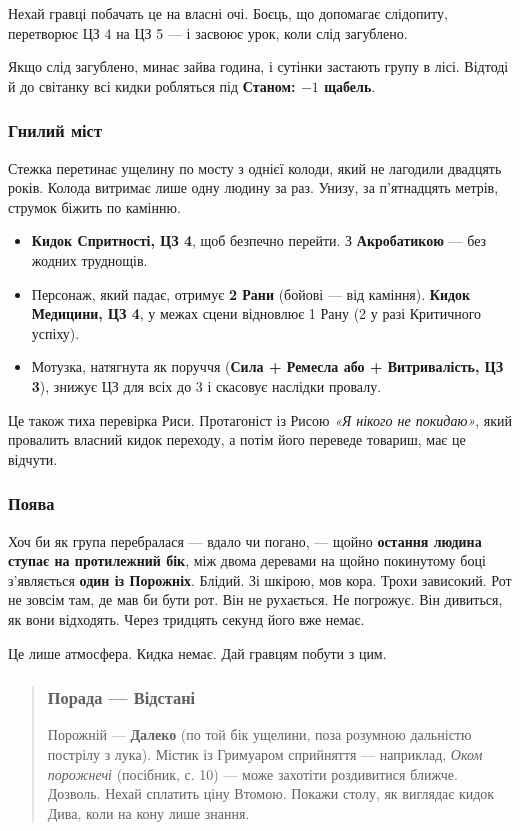 \documentclass[10pt,a4paper]{article}
\newcommand{\tightlist}{\setlength{\itemsep}{0pt}\setlength{\parskip}{0pt}}
\begin{document}
Нехай гравці побачать це на власні очі. Боєць, що допомагає слідопиту, перетворює ЦЗ 4 на ЦЗ 5 --- і засвоює урок, коли слід загублено.

Якщо слід загублено, минає зайва година, і сутінки застають групу в лісі. Відтоді й до світанку всі кидки робляться під \textbf{Станом: $-1$ щабель}.

\subsubsection{Гнилий міст}\label{ux433ux43dux438ux43bux438ux439-ux43cux456ux441ux442}

Стежка перетинає ущелину по мосту з однієї колоди, який не лагодили двадцять років. Колода витримає лише одну людину за раз. Унизу, за п’ятнадцять метрів, струмок біжить по камінню.

\begin{itemize}
\tightlist
\item
  \textbf{Кидок Спритності, ЦЗ 4}, щоб безпечно перейти. З \textbf{Акробатикою} --- без жодних труднощів.
\item
  Персонаж, який падає, отримує \textbf{2 Рани} (бойові --- від каміння). \textbf{Кидок Медицини, ЦЗ 4}, у межах сцени відновлює 1 Рану (2 у разі Критичного успіху).
\item
  Мотузка, натягнута як поруччя (\textbf{Сила + Ремесла або + Витривалість, ЦЗ 3}), знижує ЦЗ для всіх до 3 і скасовує наслідки провалу.
\end{itemize}

Це також тиха перевірка Риси. Протагоніст із Рисою \emph{«Я нікого не покидаю»}, який провалить власний кидок переходу, а потім його переведе товариш, має це відчути.

\subsubsection{Поява}\label{ux43fux43eux44fux432ux430}

Хоч би як група перебралася --- вдало чи погано, --- щойно \textbf{остання людина ступає на протилежний бік}, між двома деревами на щойно покинутому боці з’являється \textbf{один із Порожніх}. Блідий. Зі шкірою, мов кора. Трохи зависокий. Рот не зовсім там, де мав би бути рот. Він не рухається. Не погрожує. Він дивиться, як вони відходять. Через тридцять секунд його вже немає.

Це лише атмосфера. Кидка немає. Дай гравцям побути з цим.

\begin{quote}
\subsubsection{Порада --- Відстані}\label{ux43fux43eux440ux430ux434ux430-ux432ux456ux434ux441ux442ux430ux43dux456}

Порожній --- \textbf{Далеко} (по той бік ущелини, поза розумною дальністю пострілу з лука). Містик із Гримуаром сприйняття --- наприклад, \emph{Оком порожнечі} (посібник, с. 10) --- може захотіти роздивитися ближче. Дозволь. Нехай сплатить ціну Втомою. Покажи столу, як виглядає кидок Дива, коли на кону лише знання.
\end{quote}
\end{document}
